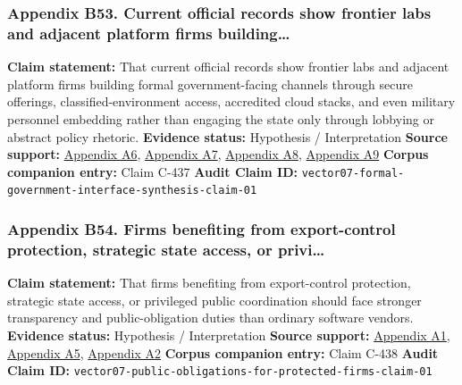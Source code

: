 \documentclass[
  american,
  11pt,
  letterpaper,
]{article}
\begin{document}
\subsubsection{Appendix B53. Current official records show frontier labs
and adjacent platform firms
building\ldots{}}\label{appendix-b53-current-official-records-show-frontier-labs-and-adjacent-platform-firms-building}

\textbf{Claim statement:} That current official records show frontier
labs and adjacent platform firms building formal government-facing
channels through secure offerings, classified-environment access,
accredited cloud stacks, and even military personnel embedding rather
than engaging the state only through lobbying or abstract policy
rhetoric. \textbf{Evidence status:} Hypothesis / Interpretation
\textbf{Source support:}
\hyperref[appendix-a6-introducing-openai-for-government]{Appendix A6},
\hyperref[appendix-a7-claude-gov-models-for-u-s-national-security-customers]{Appendix
A7},
\hyperref[appendix-a8-anthropic-and-palantir-partner-to-bring-claude-ai-models-to-aws-for-u-s-government-intelligence-and-defense-operations]{Appendix
A8},
\hyperref[appendix-a9-army-launches-detachment-201-executive-innovation-corps-to-drive-tech-transformation]{Appendix
A9} \textbf{Corpus companion entry:} Claim C-437 \textbf{Audit Claim
ID:} \texttt{vector07-formal-government-interface-synthesis-claim-01}

\subsubsection{Appendix B54. Firms benefiting from export-control
protection, strategic state access, or
privi\ldots{}}\label{appendix-b54-firms-benefiting-from-export-control-protection-strategic-state-access-or-privi}

\textbf{Claim statement:} That firms benefiting from export-control
protection, strategic state access, or privileged public coordination
should face stronger transparency and public-obligation duties than
ordinary software vendors. \textbf{Evidence status:} Hypothesis /
Interpretation \textbf{Source support:}
\hyperref[appendix-a1-removing-barriers-to-american-leadership-in-artificial-intelligence]{Appendix
A1},
\hyperref[appendix-a5-openais-proposals-for-the-us-ai-action-plan]{Appendix
A5},
\hyperref[appendix-a2-guidance-regarding-enforcement-of-license-requirements-for-advanced-computing-items-for-entities-headquartered-in-country-group-d-5-and-macau]{Appendix
A2} \textbf{Corpus companion entry:} Claim C-438 \textbf{Audit Claim
ID:} \texttt{vector07-public-obligations-for-protected-firms-claim-01}
\end{document}
